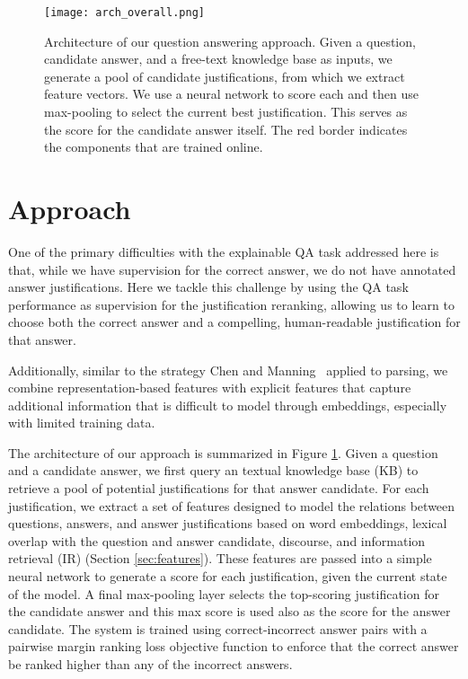 
\begin{figure}[t]
\begin{center}
\texttt{[image: arch\_overall.png]}
\caption{ Architecture of our question answering approach.  
Given a question, candidate answer, and a free-text knowledge base as inputs, we generate a pool of candidate justifications, from which we extract feature vectors.  We use a neural network to score each and then use max-pooling to select the current best justification. This serves as the score for the candidate answer itself.  The red border indicates the components that are trained online. }
\label{fig:arch_overall}
\vspace{-5mm}
\end{center}
\end{figure}

\section{Approach}
\label{sec:approach}
One of the primary difficulties with the explainable QA task addressed here is that, while we have supervision for the correct answer, we do not have annotated answer justifications.  
Here we tackle this challenge by using the QA task performance as supervision for the justification reranking, allowing us to 
learn to choose both the correct answer and a compelling, human-readable justification for that answer.

Additionally, similar to the strategy Chen and Manning~ applied to parsing, we combine representation-based features with explicit features that capture additional information that is difficult to model through embeddings, especially with limited training data.



The architecture of our approach is summarized in Figure \ref{fig:arch_overall}.  
Given a question and a candidate answer, we first query an textual knowledge base (KB) to retrieve a pool of potential justifications for that answer candidate.  
For each justification, we extract a set of features designed to model the relations between questions, answers, and answer justifications based on word embeddings, lexical overlap with the question and answer candidate, discourse, and information retrieval (IR) (Section \ref{sec:features}).
These features are passed into a simple neural network to generate a score for each justification, given the current state of the model.  A final max-pooling layer selects the top-scoring justification for the candidate answer and this max score is used also as the score for the answer candidate.  
The system is trained using correct-incorrect answer pairs with a pairwise margin ranking loss objective function to enforce that the correct answer be ranked higher than any of the incorrect answers. 

